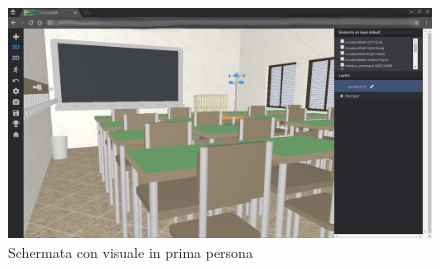 \begin{figure}[htbp] %
   \centering
   \includegraphics[width=1\linewidth]{images/3d-school}
   \caption{Schermata con visuale in prima persona}
   \label{fig:3D-school}
\end{figure}
\newpage

